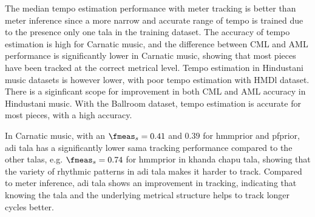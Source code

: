 The median tempo estimation performance with meter tracking is better than meter inference since a more narrow and accurate range of tempo is trained due to the presence only one \gls{tala} in the training dataset. The accuracy of tempo estimation is high for Carnatic music, and the difference between \gls{CML} and \gls{AML} performance is significantly lower in Carnatic music, showing that most pieces have been tracked at the correct metrical level. Tempo estimation in Hindustani music datasets is however lower, with poor tempo estimation with \acrshort{HMDl} dataset. There is a siginficant scope for improvement in both \gls{CML} and \gls{AML} accuracy in Hindustani music. With the Ballroom dataset, tempo estimation is accurate for most pieces, with a high accuracy. 

In Carnatic music, with an $\fmeas_s = 0.41$ and $0.39$ for \acrshort{hmmprior} and \acrshort{pfprior}, \gls{adi} \gls{tala} has a significantly lower \gls{sama} tracking performance compared to the other \glspl{tala}, e.g. $\fmeas_s = 0.74$ for \acrshort{hmmprior} in \gls{khanda chapu} \gls{tala}, showing that the variety of rhythmic patterns in \gls{adi} \gls{tala} makes it harder to track. Compared to meter inference, \gls{adi} \gls{tala} shows an improvement in tracking, indicating that knowing the \gls{tala} and the underlying metrical structure helps to track longer cycles better. 

